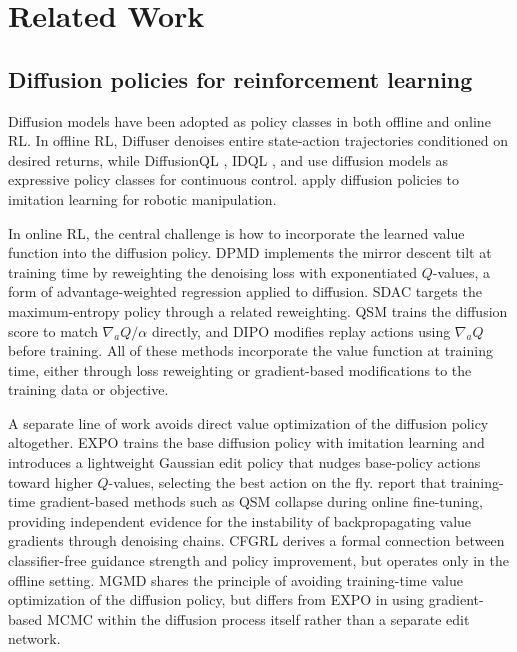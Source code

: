 \documentclass{article}
\theoremstyle{plain}
\theoremstyle{definition}
\theoremstyle{remark}
\begin{document}
\section{Related Work}
\label{sec:related}

\subsection{Diffusion policies for reinforcement learning}

Diffusion models have been adopted as policy classes in both offline and online RL.
In offline RL, Diffuser \citep{janner2022diffuser} denoises entire state-action trajectories conditioned on desired returns, while DiffusionQL \citep{lu2024diffusionql}, IDQL \citep{hansen2023idql}, and \citet{wang2023diffusion} use diffusion models as expressive policy classes for continuous control.
\citet{chi2023diffusion} apply diffusion policies to imitation learning for robotic manipulation.

In online RL, the central challenge is how to incorporate the learned value function into the diffusion policy.
DPMD \citep{ma2025soft} implements the mirror descent tilt at training time by reweighting the denoising loss with exponentiated $Q$-values, a form of advantage-weighted regression applied to diffusion.
SDAC \citep{ma2025soft} targets the maximum-entropy policy through a related reweighting.
QSM \citep{psenka2024qsm} trains the diffusion score to match $\nabla_a Q / \alpha$ directly, and DIPO \citep{yang2023dipo} modifies replay actions using $\nabla_a Q$ before training.
All of these methods incorporate the value function at training time, either through loss reweighting or gradient-based modifications to the training data or objective.

A separate line of work avoids direct value optimization of the diffusion policy altogether.
EXPO \citep{dong2025expo} trains the base diffusion policy with imitation learning and introduces a lightweight Gaussian edit policy that nudges base-policy actions toward higher $Q$-values, selecting the best action on the fly.
\citet{dong2025expo} report that training-time gradient-based methods such as QSM collapse during online fine-tuning, providing independent evidence for the instability of backpropagating value gradients through denoising chains.
CFGRL \citep{frans2025cfgrl} derives a formal connection between classifier-free guidance strength and policy improvement, but operates only in the offline setting.
MGMD shares the principle of avoiding training-time value optimization of the diffusion policy, but differs from EXPO in using gradient-based MCMC within the diffusion process itself rather than a separate edit network.
\end{document}
